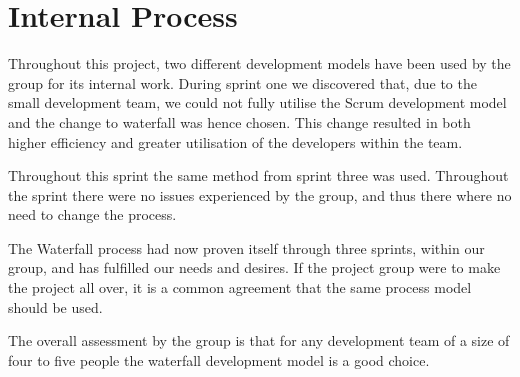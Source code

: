 \section{Internal Process}
Throughout this project, two different development models have been used by the group for its internal work.
During sprint one we discovered that, due to the small development team, we could not fully utilise the Scrum development model and the change to waterfall was hence chosen. 
This change resulted in both higher efficiency and greater utilisation of the developers within the team.

Throughout this sprint the same method from sprint three was used.
Throughout the sprint there were no issues experienced by the group, and thus there where no need to change the process. 

The Waterfall process had now proven itself through three sprints, within our group, and has fulfilled our needs and desires.
If the project group were to make the project all over, it is a common agreement that the same process model should be used. 

The overall assessment by the group is that for any development team of a size of four to five people the waterfall development model is a good choice. 

